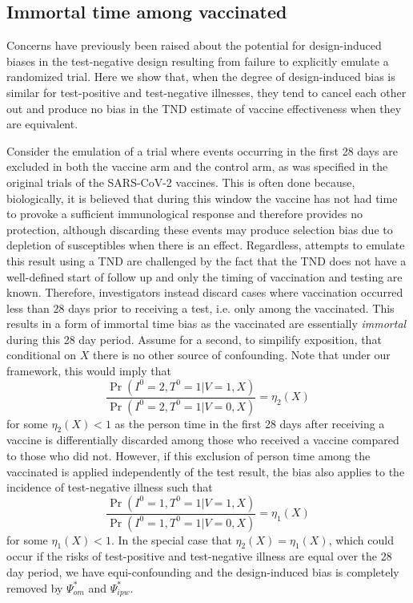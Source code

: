 \begin{appendix}
    \subsection{Immortal time among vaccinated}
    Concerns have previously been raised about the potential for design-induced biases in the test-negative design resulting from failure to explicitly emulate a randomized trial. Here we show that, when the degree of design-induced bias is similar for test-positive and test-negative illnesses, they tend to cancel each other out and produce no bias in the TND estimate of vaccine effectiveness when they are equivalent. 
    
    Consider the emulation of a trial where events occurring in the first 28 days are excluded in both the vaccine arm and the control arm, as was specified in the original trials of the SARS-CoV-2 vaccines. This is often done because, biologically, it is believed that during this window the vaccine has not had time to provoke a sufficient immunological response and therefore provides no protection, although discarding these events may produce selection bias due to depletion of susceptibles when there is an effect. Regardless, attempts to emulate this result using a TND are challenged by the fact that the TND does not have a well-defined start of follow up and only the timing of vaccination and testing are known. Therefore, investigators instead discard cases where vaccination occurred less than 28 days prior to receiving a test, i.e. only among the vaccinated. This results in a form of immortal time bias as the vaccinated are essentially \textit{immortal} during this 28 day period. Assume for a second, to simpilify exposition, that conditional on $X$ there is no other source of confounding. Note that under our framework, this would imply that 
\begin{equation*}
     \frac{\Pr(I^0 = 2, T^0 = 1 | V = 1, X)}{\Pr(I^0 = 2, T^0 = 1| V = 0, X)} = \eta_2(X)
\end{equation*}
for some $\eta_2(X) < 1$ as the person time in the first 28 days after receiving a vaccine is differentially discarded among those who received a vaccine compared to those who did not. However, if this exclusion of person time among the vaccinated is applied independently of the test result,  the bias also applies to the incidence of test-negative illness such that
\begin{equation*}
     \frac{\Pr(I^0 = 1, T^0 = 1 | V = 1, X)}{\Pr(I^0 = 1, T^0 = 1| V = 0, X)} = \eta_1(X)
\end{equation*}
for some $\eta_1(X) < 1$. In the special case that $\eta_2(X) = \eta_1(X)$, which could occur if the risks of test-positive and test-negative illness are equal over the 28 day period, we have equi-confounding and the design-induced bias is completely removed by $\Psi^*_{om}$ and $\Psi^*_{ipw}$.


\end{appendix}

